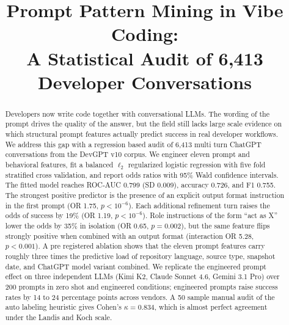 \documentclass[conference]{IEEEtran}
\begin{document}
\title{Prompt Pattern Mining in Vibe Coding: \\ A Statistical Audit of 6,413 Developer Conversations}

\author{
\and
{}
\and
{}
}

\maketitle

\begin{abstract}
Developers now write code together with conversational LLMs. The wording of the prompt drives the quality of the answer, but the field still lacks large scale evidence on which structural prompt features actually predict success in real developer workflows. We address this gap with a regression based audit of 6,413 multi turn ChatGPT conversations from the DevGPT v10 corpus. We engineer eleven prompt and behavioral features, fit a balanced $\ell_2$ regularized logistic regression with five fold stratified cross validation, and report odds ratios with 95\% Wald confidence intervals. The fitted model reaches ROC-AUC 0.799 (SD 0.009), accuracy 0.726, and F1 0.755. The strongest positive predictor is the presence of an explicit output format instruction in the first prompt (OR 1.75, $p < 10^{-6}$). Each additional refinement turn raises the odds of success by 19\% (OR 1.19, $p < 10^{-6}$). Role instructions of the form ``act as X'' lower the odds by 35\% in isolation (OR 0.65, $p = 0.002$), but the same feature flips strongly positive when combined with an output format (interaction OR 5.28, $p < 0.001$). A pre registered ablation shows that the eleven prompt features carry roughly three times the predictive load of repository language, source type, snapshot date, and ChatGPT model variant combined. We replicate the engineered prompt effect on three independent LLMs (Kimi K2, Claude Sonnet 4.6, Gemini 3.1 Pro) over 200 prompts in zero shot and engineered conditions; engineered prompts raise success rates by 14 to 24 percentage points across vendors. A 50 sample manual audit of the auto labeling heuristic gives Cohen's $\kappa = 0.834$, which is almost perfect agreement under the Landis and Koch scale.
\end{abstract}
\end{document}
